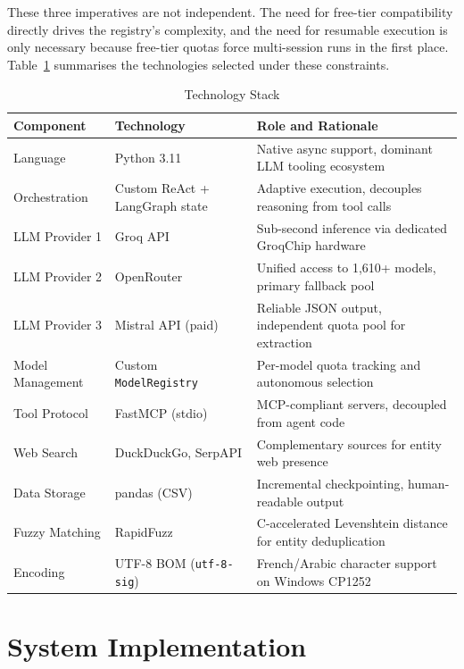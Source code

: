 These three imperatives are not independent. The need for free-tier compatibility
directly drives the registry's complexity, and the need for resumable execution is
only necessary because free-tier quotas force multi-session runs in the first place.
Table~\ref{tab:stack} summarises the technologies selected under these constraints.

\begin{table}[H]
\centering
\caption{Technology Stack}
\label{tab:stack}
\begin{tabular}{|p{3.2cm}|p{3.0cm}|p{6.8cm}|}
\hline
\textbf{Component} & \textbf{Technology} & \textbf{Role and Rationale} \\
\hline
Language & Python 3.11 & Native async support, dominant LLM tooling ecosystem \\
\hline
Orchestration & Custom ReAct + LangGraph state & Adaptive execution, decouples reasoning from tool calls \\
\hline
LLM Provider 1 & Groq API & Sub-second inference via dedicated GroqChip hardware \\
\hline
LLM Provider 2 & OpenRouter & Unified access to 1,610+ models, primary fallback pool \\
\hline
LLM Provider 3 & Mistral API (paid) & Reliable JSON output, independent quota pool for extraction \\
\hline
Model Management & Custom \texttt{ModelRegistry} & Per-model quota tracking and autonomous selection \\
\hline
Tool Protocol & FastMCP (stdio) & MCP-compliant servers, decoupled from agent code \\
\hline
Web Search & DuckDuckGo, SerpAPI & Complementary sources for entity web presence \\
\hline
Data Storage & pandas (CSV) & Incremental checkpointing, human-readable output \\
\hline
Fuzzy Matching & RapidFuzz & C-accelerated Levenshtein distance for entity deduplication \\
\hline
Encoding & UTF-8 BOM (\texttt{utf-8-sig}) & French/Arabic character support on Windows CP1252 \\
\hline
\end{tabular}
\end{table}

\section{System Implementation}
\label{sec:implementation}

